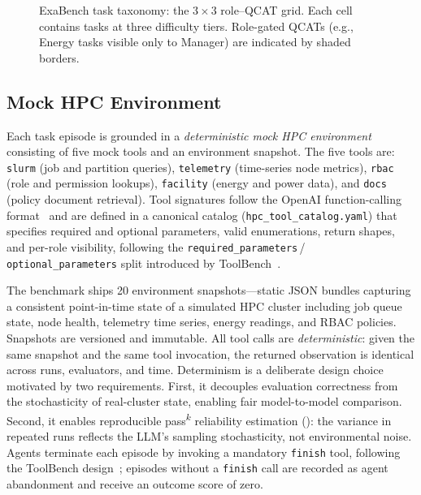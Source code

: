 \documentclass[12pt]{article}
\begin{document}
\begin{figure}[t]
  \centering
  \caption{ExaBench task taxonomy: the $3 \times 3$ role--QCAT grid.  Each
  cell contains tasks at three difficulty tiers.  Role-gated QCATs (e.g.,
  Energy tasks visible only to Manager) are indicated by shaded borders.}
  \label{fig:taxonomy}
\end{figure}

\subsection{Mock HPC Environment}
\label{sec:mock-env}

Each task episode is grounded in a \emph{deterministic mock HPC environment}
consisting of five mock tools and an environment snapshot.  The five tools are:
\texttt{slurm} (job and partition queries), \texttt{telemetry} (time-series
node metrics), \texttt{rbac} (role and permission lookups), \texttt{facility}
(energy and power data), and \texttt{docs} (policy document retrieval).  Tool
signatures follow the OpenAI function-calling format~\citep{bfcl2024} and are
defined in a canonical catalog (\texttt{hpc\_tool\_catalog.yaml}) that
specifies required and optional parameters, valid enumerations, return shapes,
and per-role visibility, following the \texttt{required\_parameters}\,/\,\texttt{optional\_parameters}
split introduced by ToolBench~\citep{qin2023toolllm}.

The benchmark ships 20 environment snapshots---static JSON bundles capturing
a consistent point-in-time state of a simulated HPC cluster including job
queue state, node health, telemetry time series, energy readings, and RBAC
policies.  Snapshots are versioned and immutable.  All tool calls are
\emph{deterministic}: given the same snapshot and the same tool invocation,
the returned observation is identical across runs, evaluators, and time.
Determinism is a deliberate design choice motivated by two requirements.
First, it decouples evaluation correctness from the stochasticity of
real-cluster state, enabling fair model-to-model comparison.  Second, it
enables reproducible pass\textsuperscript{$k$} reliability estimation
(): the variance in repeated runs reflects the
LLM's sampling stochasticity, not environmental noise.  Agents terminate
each episode by invoking a mandatory \texttt{finish} tool, following the
ToolBench design~\citep{qin2023toolllm}; episodes without a \texttt{finish}
call are recorded as agent abandonment and receive an outcome score of zero.
\end{document}
